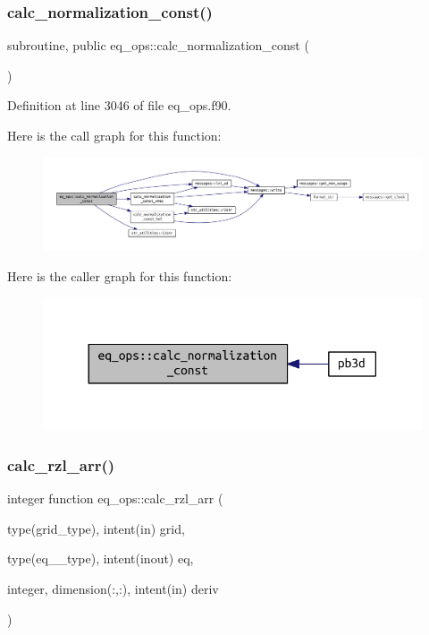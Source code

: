 \subsubsection{\texorpdfstring{calc\+\_\+normalization\+\_\+const()}{calc\_normalization\_const()}}
{\footnotesize\ttfamily subroutine, public eq\+\_\+ops\+::calc\+\_\+normalization\+\_\+const (\begin{DoxyParamCaption}{ }\end{DoxyParamCaption})}



Definition at line 3046 of file eq\+\_\+ops.\+f90.

Here is the call graph for this function\+:
\nopagebreak
\begin{figure}[H]
\begin{center}
\leavevmode
\includegraphics[width=350pt]{namespaceeq__ops_a09b10d95cd83c89e817664a954f7555d_cgraph}
\end{center}
\end{figure}
Here is the caller graph for this function\+:
\nopagebreak
\begin{figure}[H]
\begin{center}
\leavevmode
\includegraphics[width=330pt]{namespaceeq__ops_a09b10d95cd83c89e817664a954f7555d_icgraph}
\end{center}
\end{figure}
\mbox{\label{namespaceeq__ops_a366f4cef2390a357f73e73ca56a57497}} 
\subsubsection{\texorpdfstring{calc\+\_\+rzl\+\_\+arr()}{calc\_rzl\_arr()}}
{\footnotesize\ttfamily integer function eq\+\_\+ops\+::calc\+\_\+rzl\+\_\+arr (\begin{DoxyParamCaption}\item[{type(grid\+\_\+type), intent(in)}]{grid,  }\item[{type(eq\+\_\+2\+\_\+type), intent(inout)}]{eq,  }\item[{integer, dimension(\+:,\+:), intent(in)}]{deriv }\end{DoxyParamCaption})}



